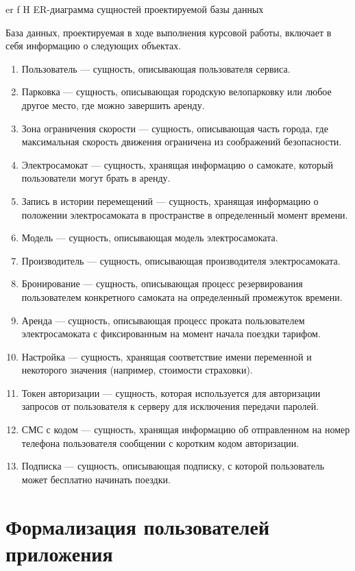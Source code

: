 {er}
{f}
{H}
{\textwidth}
{ER-диаграмма сущностей проектируемой базы данных}

База данных, проектируемая в ходе выполнения курсовой работы, включает в себя информацию о следующих объектах.

\begin{enumerate}
	\item Пользователь --- сущность, описывающая пользователя сервиса.
	\item Парковка --- сущность, описывающая городскую велопарковку или любое другое место, где можно завершить аренду.
	\item Зона ограничения скорости --- сущность, описывающая часть города, где максимальная скорость движения ограничена из соображений безопасности.
	\item Электросамокат --- сущность, хранящая информацию о самокате, который пользователи могут брать в аренду.
	\item Запись в истории перемещений --- сущность, хранящая информацию о положении электросамоката в пространстве в определенный момент времени.
	\item Модель --- сущность, описывающая модель электросамоката.
	\item Производитель --- сущность, описывающая производителя электросамоката.
	\item Бронирование --- сущность, описывающая процесс резервирования пользователем конкретного самоката на определенный промежуток времени.
	\item Аренда --- сущность, описывающая процесс проката пользователем электросамоката с фиксированным на момент начала поездки тарифом.
	\item Настройка --- сущность, хранящая соответствие имени переменной и некоторого значения (например, стоимости страховки).
	\item Токен авторизации --- сущность, которая используется для авторизации запросов от пользователя к серверу для исключения передачи паролей.
	\item СМС с кодом --- сущность, хранящая информацию об отправленном на номер телефона пользователя сообщении с коротким кодом авторизации.
	\item Подписка --- сущность, описывающая подписку, с которой пользователь может бесплатно начинать поездки.
\end{enumerate}

\section{Формализация пользователей приложения}

